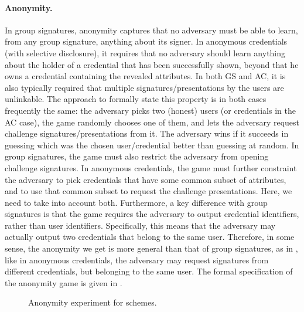 \paragraph{Anonymity.} %
In group signatures, anonymity captures that no adversary must be able to learn,
from any group signature, anything about its signer. In anonymous credentials
(with selective disclosure), it requires that no adversary should learn anything
about the holder of a credential that has been successfully shown, beyond that
he owns a credential containing the revealed attributes. In both GS and AC, it
is also typically required that
multiple signatures/presentations by the users are unlinkable. The approach to
formally state this property is in both cases frequently the same: the adversary
picks two (honest) users (or credentials in the AC case), the game randomly
chooses one of them, and lets the adversary request challenge
signatures/presentations from it. The adversary wins if it succeeds in guessing
which was the chosen user/credential better than guessing at random. In group
signatures, the game must also restrict the adversary from opening challenge
signatures. In anonymous credentials, the game must further constraint the
adversary to pick credentials that have some common subset of attributes, and
to use that common subset to request the challenge presentations. Here, we need
to take into account both. Furthermore, a key difference with group signatures
is that the game requires the adversary to output credential identifiers, rather
than user identifiers. Specifically, this means that the adversary may actually
output two credentials that belong to the same user. Therefore, in some sense,
the anonymity we get is more general than that of group signatures, as in \GSAC,
like in anonymous credentials, the adversary may request signatures from
different credentials, but belonging to the same user. The formal
specification of the anonymity game is given in .

\begin{figure}[htp!]
  \caption{Anonymity experiment for \GSAC schemes.}
  \label{fig:exp-gsac-anonb}
\end{figure}

